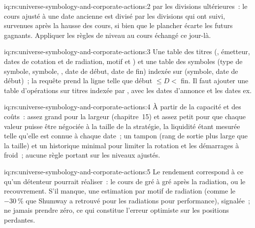\begin{solution}{iq:rs:universe-symbology-and-corporate-actions:2}
 par les divisions ultérieures~: le cours ajusté à une date ancienne est divisé par les divisions qui ont suivi, survenues après
la hausse des cours, si bien que le plancher écarte les futurs gagnants. Appliquer les règles de niveau au cours échangé ce jour-là.
\end{solution}

\begin{solution}{iq:rs:universe-symbology-and-corporate-actions:3}
Une table des titres (, émetteur, dates de cotation et de radiation, motif et ) et une table des symboles (type de symbole,
symbole, , date de début, date de fin) indexée sur (symbole, date de début)~; la requête prend la ligne telle que début $\le D <$ fin. Il faut ajouter une
table d'opérations sur titres indexée par , avec les dates d'annonce et les dates ex.
\end{solution}

\begin{solution}{iq:rs:universe-symbology-and-corporate-actions:4}
À partir de la capacité et des coûts~: assez grand pour la largeur (chapitre~15) et assez petit pour que chaque valeur puisse être négociée à la taille de la
stratégie, la liquidité étant mesurée telle qu'elle est connue à chaque date~; un tampon (rang de sortie plus large que la taille) et un historique minimal pour limiter la rotation
et les démarrages à froid~; aucune règle portant sur les niveaux ajustés.
\end{solution}

\begin{solution}{iq:rs:universe-symbology-and-corporate-actions:5}
Le rendement correspond à ce qu'un détenteur pourrait réaliser~: le cours de gré à gré après la radiation, ou le recouvrement. S'il manque, une
estimation par motif de radiation (comme le $-30~\%$ que Shumway a retrouvé pour les radiations pour performance), signalée~; ne jamais prendre zéro, ce qui constitue
l'erreur optimiste sur les positions perdantes.
\end{solution}

